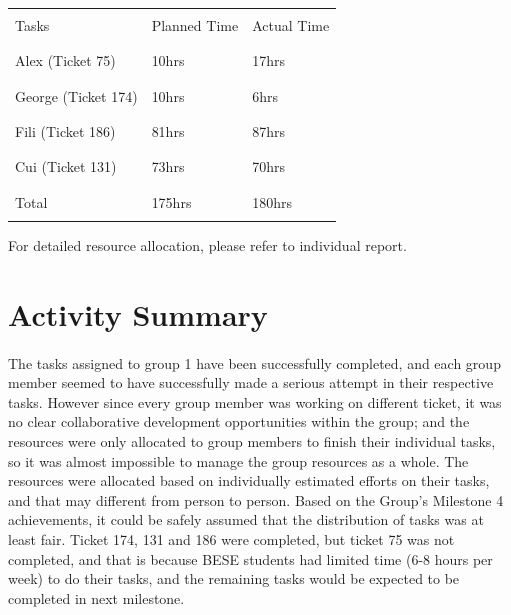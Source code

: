 \documentclass[10pt,a4,oneside]{article}
\begin{document}
\begin{table}[ht!]
\begin{tabular}{|p{5cm}|p{1.5cm}|p{1.5cm}|} 
\hline
 & & \\
Tasks & Planned Time & Actual Time\\
 & & \\
\hline
 & & \\
Alex (Ticket 75) & 10hrs & 17hrs\\
 & & \\
\hline
 & & \\
George (Ticket 174) & 10hrs & 6hrs\\
 & & \\
\hline
 & & \\
Fili (Ticket 186) & 81hrs & 87hrs\\
 & & \\
\hline
 & & \\
Cui (Ticket 131) & 73hrs & 70hrs\\
 & & \\
\hline
 & & \\
Total & 175hrs & 180hrs\\
 & & \\
\hline
\end{tabular}
\end{table}

For detailed resource allocation, please refer to individual report.
\section{Activity Summary}

\paragraph{}
The tasks assigned to group 1 have been successfully completed, and each group member seemed to have successfully made a serious attempt in their respective tasks. However since every group member was working on different ticket, it was no clear collaborative development opportunities within the group; and the resources were only allocated to group members to finish their individual tasks, so it was almost impossible to manage the group resources as a whole. The resources were allocated based on individually estimated efforts on their tasks, and that may different from person to person. Based on the Group's Milestone 4 achievements, it could be safely assumed that the distribution of tasks was at least fair. Ticket 174, 131 and 186 were completed, but ticket 75 was not completed, and that is because BESE students had limited time (6-8 hours per week) to do their tasks, and the remaining tasks would be expected to be completed in next milestone. 
\end{document}
